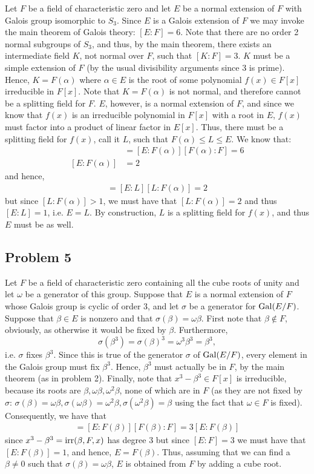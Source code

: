 \documentclass{../../mathnotes}
\begin{document}
Let $F$ be a field of characteristic zero and let $E$ be a normal extension of $F$ with Galois group isomorphic
to $S_3$. Since $E$ is a Galois extension of $F$ we may invoke the main theorem of Galois theory: $[E:F]=6$.
Note that there are no order 2 normal subgroups of $S_3$, and thus, by the main theorem, there exists an intermediate
field $K$, not normal over $F$, such that $[K:F]=3$. $K$ must be a simple extension of $F$ (by the usual divisibility
arguments since 3 is prime). Hence, $K=F(\alpha)$ where $\alpha\in E$ is the root of some polynomial $f(x)\in F[x]$
irreducible in $F[x]$. Note that $K=F(\alpha)$ is not normal, and therefore cannot be a splitting field for $F$.
$E$, however, is a normal extension of $F$, and since we know that $f(x)$ is an irreducible polynomial in $F[x]$
with a root in $E$, $f(x)$ must factor into a product of linear factor in $E[x]$. Thus, there must be a splitting field
for $f(x)$, call it $L$, such that $F(\alpha)\leq L\leq E$. We know that:
\begin{align*}
    [E:F]&=[E:F(\alpha)][F(\alpha):F]=6\\
    [E:F(\alpha)]&=2
\end{align*}
and hence,
\begin{align*}
    [E:F(\alpha)]=[E:L][L:F(\alpha)]=2
\end{align*}
but since $[L:F(\alpha)]>1$, we must have that $[L:F(\alpha)]=2$ and thus $[E:L]=1$, i.e. $E=L$.
By construction, $L$ is a splitting field for $f(x)$, and thus $E$ must be as well.

\subsection*{Problem 5}
Let $F$ be a field of characteristic zero containing all the cube roots of unity and let $\omega$ be a generator
of this group. Suppose that $E$ is a normal extension of $F$ whose Galois group is cyclic of order 3, and let
$\sigma$ be a generator for $\operatorname{Gal}(E/F)$. Suppose that $\beta\in E$ is nonzero and that $\sigma(\beta)=\omega\beta$.
First note that $\beta\notin F$, obviously, as otherwise it would be fixed by $\beta$. Furthermore,
\[ \sigma(\beta^3)=\sigma(\beta)^3=\omega^3\beta^3=\beta^3,  \]
i.e. $\sigma$ fixes $\beta^3$. Since this is true of the generator $\sigma$ of $\operatorname{Gal}(E/F)$, 
every element in the Galois group must fix $\beta^3$.  Hence, $\beta^3$ must actually be in $F$, by
the main theorem (as in problem 2). Finally, note that $x^3-\beta^3\in F[x]$ is irreducible, because
its roots are $\beta,\omega\beta,\omega^2\beta$, none of which are in $F$ (as they are not fixed by $\sigma$:
$\sigma(\beta)=\omega\beta,\sigma(\omega\beta)=\omega^2\beta, \sigma(\omega^2\beta)=\beta$ using
the fact that $\omega\in F$ is fixed).
Consequently, we have that
\begin{align*}
    [E:F]=[E:F(\beta)][F(\beta):F]=3[E:F(\beta)]
\end{align*}
since $x^3-\beta^3=\operatorname{irr}(\beta,F,x)$ has degree 3 but since $[E:F]=3$ we must have that $[E:F(\beta)]=1$,
and hence, $E=F(\beta)$. Thus, assuming that we can find a $\beta\neq 0$ such that $\sigma(\beta)=\omega\beta$,
$E$ is obtained from $F$ by adding a cube root.
\end{document}
